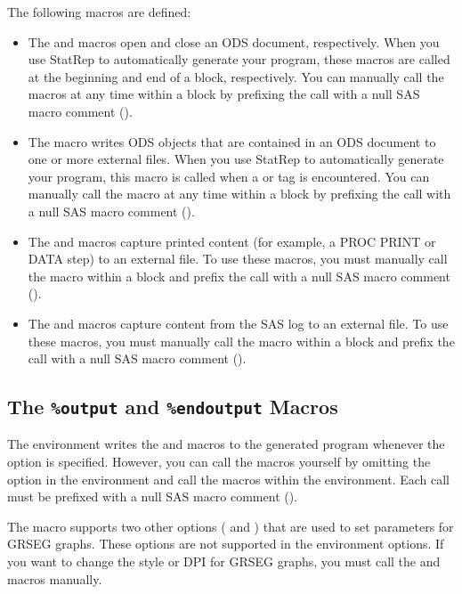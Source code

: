 \documentclass[article,oneside]{memoir}
\newcommand*{\StatRep}{\textsf{StatRep}\xspace}
\begin{document}
  The following macros are defined:
  \begin{itemize}
  \item The  and  macros open and close an ODS document, respectively.
  When you use \StatRep to automatically generate your program, these macros are called at the
  beginning and end of a  block, respectively. 
  You can manually call the macros at any time within
  a  block by prefixing the call with a null SAS macro comment (\Code{\%*;}).
  
  \item The   macro writes ODS objects that are contained in an ODS document to 
  one or more external files.
  When you use \StatRep to automatically generate your program, this macro is called when
  a  or  tag is encountered. You can manually call the macro 
  at any time within a  block by prefixing the call with a null 
  SAS macro comment (\Code{\%*;}).
  
  \item The  and  macros capture printed content 
  (for example, a PROC PRINT or DATA step) to an external file. To use these macros,
  you must manually call the macro 
  within a  block and prefix the call with a null 
  SAS macro comment (\Code{\%*;}).
  
  \item The  and  macros capture content from the 
  SAS log to an external file. To use these macros,
  you must manually call the macro 
  within a  block and prefix the call with a null 
  SAS macro comment (\Code{\%*;}).
  \end{itemize}
  
 
  \subsection{The \texttt{\%output} and \texttt{\%endoutput} Macros}\label{outputmacro}
  The  environment writes the  and  macros to 
  the generated program 
  whenever the  option is specified.
  However, you can call the macros 
  yourself by omitting the  option in the  environment and 
  call the macros within the  environment. Each call must be prefixed 
  with a null SAS macro comment (\Code{\%*;}).
  
  The  macro supports two other options ( and ) that are used to 
  set parameters for GRSEG graphs. These options are not supported in the
   environment options. If you want to change the style or DPI for 
  GRSEG graphs, you must call the  and  macros manually.
  
\end{document}
